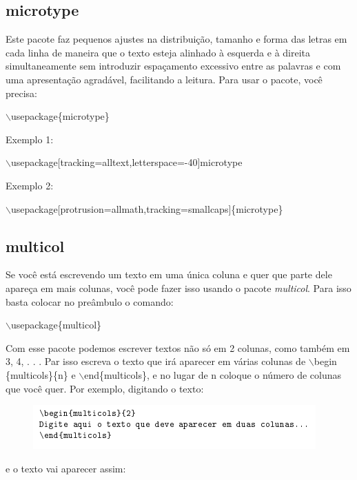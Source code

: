 \documentclass[12pt]{article}
\begin{document}
		\subsection{microtype}
			Este pacote faz pequenos ajustes na distribuição, tamanho e forma das letras em cada linha de maneira que o texto esteja alinhado à esquerda e à direita simultaneamente sem introduzir espaçamento excessivo entre as palavras e com uma apresentação agradável, facilitando a leitura. Para usar o pacote, você precisa:\\
			\begin{center}
				$\backslash$usepackage\{{microtype}\}
			\end{center}
			Exemplo 1:\\
			\begin{center}
				$\backslash$usepackage[tracking=alltext,letterspace=-40]{microtype}
			\end{center}
			Exemplo 2:\\
			\begin{center}
				$\backslash$usepackage[protrusion=allmath,tracking=smallcaps]\{{microtype}\}
			\end{center}
		
		\subsection{multicol}
			Se você está escrevendo um texto em uma única coluna e quer que parte dele apareça em mais colunas, você
			pode fazer isso usando o pacote \textit{multicol}. Para isso basta colocar no preâmbulo o comando:\\
			\begin{center}
				$\backslash$usepackage\{{multicol}\}
			\end{center}
			Com esse pacote podemos escrever textos não só em 2 colunas, como também em 3, 4, . . . Par isso escreva
			o texto que irá aparecer em várias colunas de $\backslash$begin \{{multicols}\}\{{n}\} e $\backslash$end\{{multicols}\}, e no lugar de n coloque o número de colunas que você quer. Por exemplo, digitando o texto:
			\begin{figure}[h]
				\centering
				\includegraphics[scale=0.8]{co.png}
			\end{figure}
		
			e o texto vai aparecer assim:
		
\end{document}
